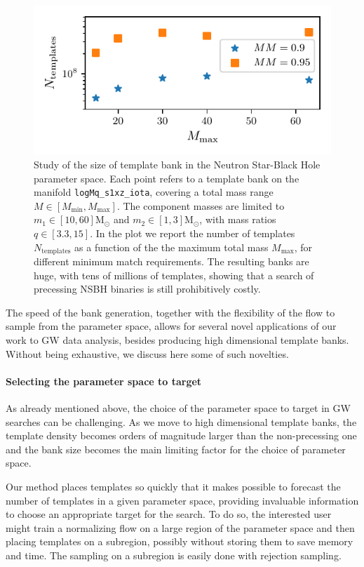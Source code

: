 \documentclass[twocolumn,showpacs,preprintnumbers,nofootinbib,prd,
superscriptaddress,10pt]{revtex4-2}
\begin{document}
\begin{figure}[t]
	\centering
	\includegraphics[scale = 1.]{NSBH_size}
	\caption{Study of the size of template bank in the Neutron Star-Black Hole parameter space. Each point refers to a template bank on the manifold \texttt{logMq\_s1xz\_iota}, covering a total mass range $M\in[M_\text{min}, M_\text{max}]$. The component masses are limited to $m_1 \in [10, 60] \mathrm{M_\odot}$ and  $m_2 \in [1, 3] \mathrm{M_\odot}$, with mass ratios $q \in [3.3, 15]$. In the plot we report the number of templates $N_\text{templates}$ as a function of the the maximum total mass $M_\text{max}$, for different minimum match requirements. The resulting banks are huge, with tens of millions of templates, showing that a search of precessing NSBH binaries is still prohibitively costly.}
	\label{fig:NSBH_size}
\end{figure}

The speed of the bank generation, together with the flexibility of the flow to sample from the parameter space, allows for several novel applications of our work to GW data analysis, besides producing high dimensional template banks.
Without being exhaustive, we discuss here some of such novelties.


\paragraph{Selecting the parameter space to target}
As already mentioned above, the choice of the parameter space to target in GW searches can be challenging. As we move to high dimensional template banks, the template density becomes orders of magnitude larger than the non-precessing one and the bank size becomes the main limiting factor for the choice of parameter space.

Our method places templates so quickly that it makes possible to forecast the number of templates in a given parameter space, providing invaluable information to choose an appropriate target for the search.
To do so, the interested user might train a normalizing flow on a large region of the parameter space and then placing templates on a subregion, possibly without storing them to save memory and time. The sampling on a subregion is easily done with rejection sampling.
\end{document}
